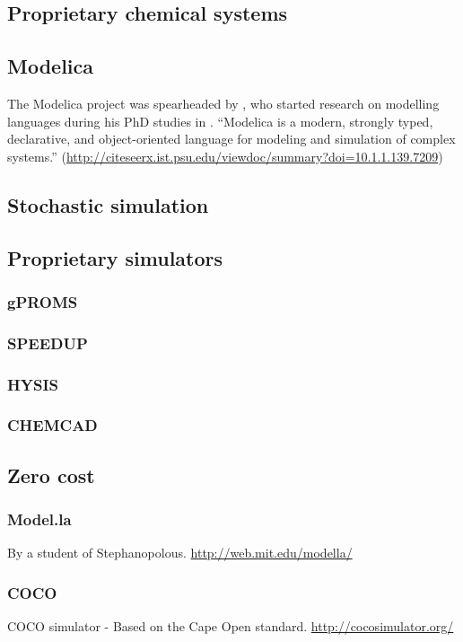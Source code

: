 \subsection{Proprietary chemical systems}

\subsection{Modelica}
The Modelica project was spearheaded by \xxx, who started research on
modelling languages during his PhD studies in \xxx.  ``Modelica is a modern, strongly typed, declarative, and object-oriented language for modeling and simulation of complex systems.'' (\url{http://citeseerx.ist.psu.edu/viewdoc/summary?doi=10.1.1.139.7209})

\subsection{Stochastic simulation}

\subsection{Proprietary simulators}
\subsubsection{gPROMS}
\subsubsection{SPEEDUP}
\subsubsection{HYSIS}
\subsubsection{CHEMCAD}

\subsection{Zero cost}
\subsubsection{Model.la}
By a student of Stephanopolous. \url{http://web.mit.edu/modella/}

\subsubsection{COCO}
COCO simulator - Based on the Cape Open standard.  \url{http://cocosimulator.org/}

